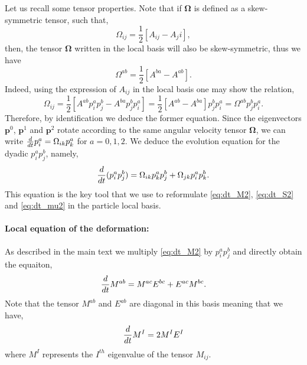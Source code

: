 Let us recall some tensor properties. 
Note that if $\bm{\Omega}$ is defined as a skew-symmetric tensor, such that, 
\begin{equation}
    \Omega_{ij} = \frac{1}{2} [A_{ij}-A_ji],
\end{equation}
then, the tensor $\bm\Omega$ written in the local basis will also be skew-symmetric, thus we have
\begin{equation}
    \Omega^{ab} = \frac{1}{2} [A^{ba}-A^{ab}]. 
\end{equation}
Indeed, using the expression of $A_{ij}$ in the local basis one may show the relation, 
\begin{equation}
    \Omega_{ij} = \frac{1}{2} [A^{ab} p^a_i p^b_j-A^{ba} p^b_j p^a_i]
    =  \frac{1}{2} [A^{ab} - A^{ba} ]p^b_j p^a_i
    =  \Omega^{ab} p^b_j p^a_i. 
\end{equation}
Therefore, by identification we deduce the former equation. 
Since the eigenvectors $\textbf{p}^0$, $\textbf{p}^1$ and  $\textbf{p}^2$ rotate according to the same angular velocity tensor $\bm\Omega$, we can write $\frac{d}{dt} p_i^a =\Omega_{ik} p_k^a$ for $a =0,1,2$. 
We deduce the evolution equation for the dyadic $p_i^ap_j^b$, namely,
\begin{equation*}
    \ddt(p_i^ap_j^b)
    = 
    \Omega_{ik} p_k^ap_j^b
    + \Omega_{jk} p_i^ap_k^b.
    \label{eq:orientation_pp}
\end{equation*}
This equation is the key tool that we use to reformulate \ref{eq:dt_M2}, \ref{eq:dt_S2} and \ref{eq:dt_mu2} in the particle local basis. 

\paragraph*{Local equation of the deformation:}
As described in the main text we multiply \ref{eq:dt_M2} by $p_i^ap_j^b$ and directly obtain the equaiton, 
\begin{equation*}
    \frac{d}{dt} M^{ab}
    = 
    M^{ac} E^{bc} 
    + E^{ac} M^{bc}. 
\end{equation*}
Note that the tensor $M^{ab}$ and $E^{ab}$ are diagonal in this basis meaning that we have, 
\begin{equation*}
    \frac{d}{dt} M^I
    = 
    2 M^I E^I
\end{equation*}
where $M^I$ represents the $I^{th}$ eigenvalue of the tensor $M_{ij}$. 

